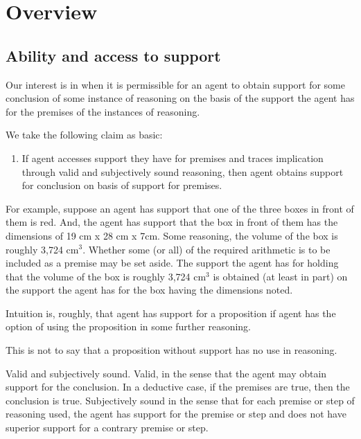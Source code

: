 
\chapter{Overview}
\label{cha:overview}

\section{Ability and access to support}
\label{sec:abil-access-supp}

\begin{note}
  Our interest is in when it is permissible for an agent to obtain support for some conclusion of some instance of reasoning on the basis of the support the agent has for the premises of the instances of reasoning.

  We take the following claim as basic:
  \begin{enumerate}[label=\bP{}, ref=\bP{}]
  \item\label{prem:bP} If agent accesses support they have for premises and traces implication through valid and subjectively sound reasoning, then agent obtains support for conclusion on basis of support for premises.
  \end{enumerate}
  For example, suppose an agent has support that one of the three boxes in front of them is red.
  And, the agent has support that the box in front of them has the dimensions of 19 cm x 28 cm x 7cm.
  Some reasoning, the volume of the box is roughly 3,724 cm\(^{3}\).
  Whether some (or all) of the required arithmetic is to be included as a premise may be set aside.
  The support the agent has for holding that the volume of the box is roughly 3,724 cm\(^{3}\) is obtained (at least in part) on the support the agent has for the box having the dimensions noted.
\end{note}

\begin{note}[Support]
  Intuition is, roughly, that agent has support for a proposition if agent has the option of using the proposition in some further reasoning.

  This is not to say that a proposition without support has no use in reasoning.
\end{note}

\begin{note}
  Valid and subjectively sound.
  Valid, in the sense that the agent may obtain support for the conclusion.
  In a deductive case, if the premises are true, then the conclusion is true.
  Subjectively sound in the sense that for each premise or step of reasoning used, the agent has support for the premise or step and does not have superior support for a contrary premise or step.
\end{note}

